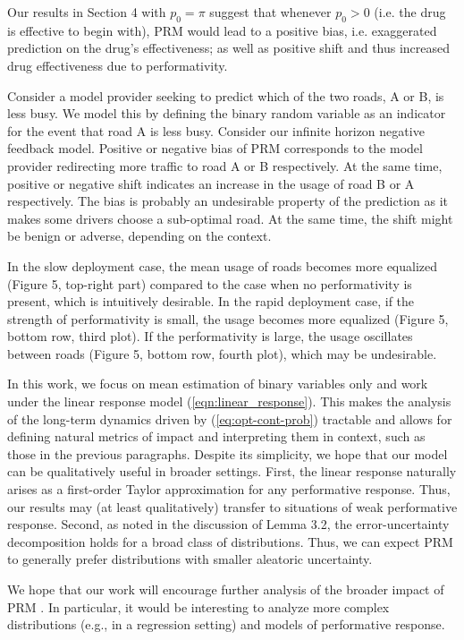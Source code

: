 Our results in Section 4 with $p_0 = \pi$ suggest that whenever $p_0 > 0$ (i.e. the drug is effective to begin with), PRM would lead to a positive bias, i.e. exaggerated prediction on the drug's effectiveness; as well as positive shift and thus increased drug effectiveness due to performativity.

 Consider a model provider seeking to predict which of the two roads, A or B, is less busy. We model this by defining the binary random variable as an indicator for the event that road A is less busy. Consider our infinite horizon negative feedback model. Positive or negative bias of PRM corresponds to the model provider redirecting more traffic to road A or B respectively. At the same time, positive or negative shift indicates an increase in the usage of road B or A respectively. The bias is probably an undesirable property of the prediction as it makes some drivers choose a sub-optimal road. At the same time, the shift might be benign or adverse, depending on the context.

In the slow deployment case, the mean usage of roads becomes more equalized (Figure 5, top-right part) compared to the case when no performativity is present, which is intuitively desirable. In the rapid deployment case, if the strength of performativity is small, the usage becomes more equalized (Figure 5, bottom row, third plot). If the performativity is large, the usage oscillates between roads (Figure 5, bottom row, fourth plot), which may be undesirable.



 In this work, we focus on mean estimation of binary variables only and work under the linear response model (\ref{eqn:linear_response}). This makes the analysis of the long-term dynamics driven by (\ref{eq:opt-cont-prob}) tractable and allows for defining natural metrics of impact and interpreting them in context, such as those in the previous paragraphs. Despite its simplicity, we hope that our model can be qualitatively useful in broader settings. First, the linear response naturally arises as a first-order Taylor approximation for any performative response. Thus, our results may (at least qualitatively) transfer to situations of weak performative response. Second, as noted in the discussion of Lemma 3.2, the error-uncertainty decomposition holds for a broad class of distributions. Thus, we can expect PRM to generally prefer distributions with smaller aleatoric uncertainty. 

We hope that our work will encourage further analysis of the broader impact of PRM . In particular, it would be interesting to
analyze more complex distributions (e.g., in a regression setting) and models
of performative response.

